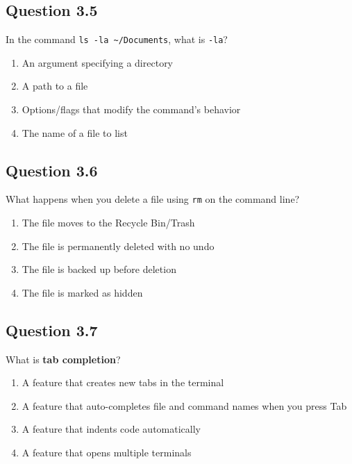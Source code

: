 \documentclass[
  letterpaper,
  DIV=11,
  numbers=noendperiod]{scrreprt}
\providecommand{\tightlist}{%
  \setlength{\itemsep}{0pt}\setlength{\parskip}{0pt}}
\begin{document}
\subsection{Question 3.5}\label{question-3.5}

In the command \texttt{ls\ -la\ \textasciitilde{}/Documents}, what is
\texttt{-la}?

\begin{enumerate}
\def\labelenumi{\Alph{enumi})}
\tightlist
\item
  An argument specifying a directory\\
\item
  A path to a file\\
\item
  Options/flags that modify the command's behavior\\
\item
  The name of a file to list
\end{enumerate}

\subsection{Question 3.6}\label{question-3.6}

What happens when you delete a file using \texttt{rm} on the command
line?

\begin{enumerate}
\def\labelenumi{\Alph{enumi})}
\tightlist
\item
  The file moves to the Recycle Bin/Trash\\
\item
  The file is permanently deleted with no undo\\
\item
  The file is backed up before deletion\\
\item
  The file is marked as hidden
\end{enumerate}

\subsection{Question 3.7}\label{question-3.7}

What is \textbf{tab completion}?

\begin{enumerate}
\def\labelenumi{\Alph{enumi})}
\tightlist
\item
  A feature that creates new tabs in the terminal\\
\item
  A feature that auto-completes file and command names when you press
  Tab\\
\item
  A feature that indents code automatically\\
\item
  A feature that opens multiple terminals
\end{enumerate}
\end{document}
